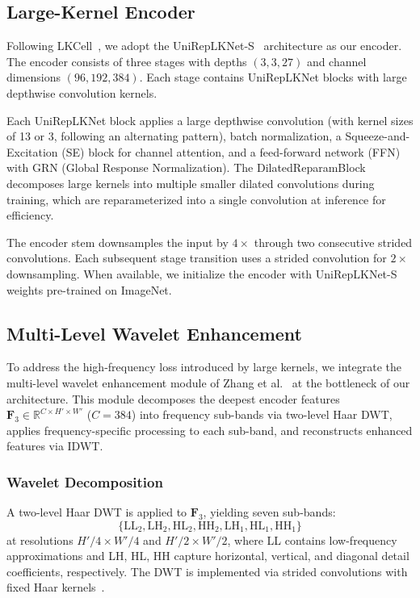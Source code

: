 \documentclass[conference]{IEEEtran}
\begin{document}
\subsection{Large-Kernel Encoder}

Following LKCell~\cite{lkcell}, we adopt the UniRepLKNet-S~\cite{unireplknet} architecture as our encoder. The encoder consists of three stages with depths $(3, 3, 27)$ and channel dimensions $(96, 192, 384)$. Each stage contains UniRepLKNet blocks with large depthwise convolution kernels.

Each UniRepLKNet block applies a large depthwise convolution (with kernel sizes of 13 or 3, following an alternating pattern), batch normalization, a Squeeze-and-Excitation (SE) block for channel attention, and a feed-forward network (FFN) with GRN (Global Response Normalization). The DilatedReparamBlock decomposes large kernels into multiple smaller dilated convolutions during training, which are reparameterized into a single convolution at inference for efficiency.

The encoder stem downsamples the input by $4\times$ through two consecutive strided convolutions. Each subsequent stage transition uses a strided convolution for $2\times$ downsampling. When available, we initialize the encoder with UniRepLKNet-S weights pre-trained on ImageNet.

\subsection{Multi-Level Wavelet Enhancement}

To address the high-frequency loss introduced by large kernels, we integrate the multi-level wavelet enhancement module of Zhang et al.~\cite{waveconvx} at the bottleneck of our architecture. This module decomposes the deepest encoder features $\mathbf{F}_3 \in \mathbb{R}^{C \times H' \times W'}$ ($C=384$) into frequency sub-bands via two-level Haar DWT, applies frequency-specific processing to each sub-band, and reconstructs enhanced features via IDWT.

\subsubsection{Wavelet Decomposition}

A two-level Haar DWT is applied to $\mathbf{F}_3$, yielding seven sub-bands:
\begin{equation}
    \{\text{LL}_2, \text{LH}_2, \text{HL}_2, \text{HH}_2, \text{LH}_1, \text{HL}_1, \text{HH}_1\}
\end{equation}
at resolutions $H'/4 \times W'/4$ and $H'/2 \times W'/2$, where LL contains low-frequency approximations and LH, HL, HH capture horizontal, vertical, and diagonal detail coefficients, respectively. The DWT is implemented via strided convolutions with fixed Haar kernels~\cite{waveconvx}.
\end{document}
